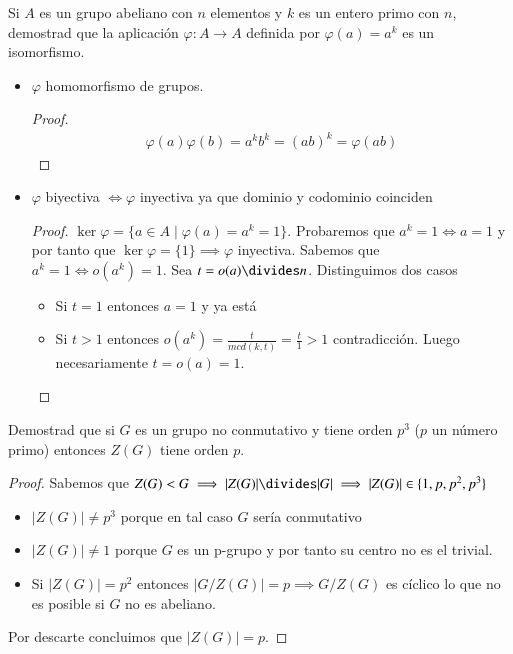 \begin{ex}[H2.13] Si $A$ es un grupo abeliano con $n$ elementos y $k$ es un entero primo con $n$, demostrad que la aplicación $\varphi : A \to A$ definida por $\varphi(a) = a^k$ es un isomorfismo.
	\begin{itemize}
		\item $\varphi$ homomorfismo de grupos.
		\begin{proof}
			\begin{align*}
				\varphi(a)\varphi(b) = a^kb^k = (ab)^k = \varphi(ab)
			\end{align*}
		\end{proof}
		\item $\varphi$ biyectiva $\iff \varphi$ inyectiva ya que dominio y codominio coinciden
		\begin{proof}
			$\ker \varphi = \{a \in A \mid \varphi(a) = a^k = 1\}$. Probaremos que $a^k = 1 \iff a = 1$ y por tanto que $\ker \varphi = \{1\} \implies \varphi$ inyectiva. Sabemos que $a^k = 1 \iff o(a^k) = 1$. Sea $t = o(a) \divides n$. Distinguimos dos casos
			\begin{itemize}
				\item Si $t = 1$ entonces $a = 1$ y ya está
				\item Si $t > 1$ entonces $o(a^k) = \frac{t}{mcd(k, t)} = \frac{t}{1} > 1$ contradicción. Luego necesariamente $t = o(a) = 1$.
			\end{itemize}
		\end{proof}
	\end{itemize}
\end{ex}

\begin{ex}[H2.22]
	\label{ex:h2.22}
	Demostrad que si $G$ es un grupo no conmutativo y tiene orden $p^3$ ($p$ un número primo) entonces $Z(G)$ tiene orden $p$.
	
	\begin{proof}
		Sabemos que $Z(G) < G \implies |Z(G)| \divides |G| \implies |Z(G)| \in \{1, p, p^2, p^3\}$
		\begin{itemize}
			\item $|Z(G)| \neq p^3$ porque en tal caso $G$ sería conmutativo
			\item $|Z(G)| \neq 1$ porque $G$ es un p-grupo y por tanto su centro no es el trivial.
			\item Si $|Z(G)| = p^2$ entonces $|G/Z(G)| = p \implies G/Z(G)$ es cíclico lo que no es posible si $G$ no es abeliano.
		\end{itemize}
	
		Por descarte concluimos que $|Z(G)| = p$.
	\end{proof}
\end{ex}


